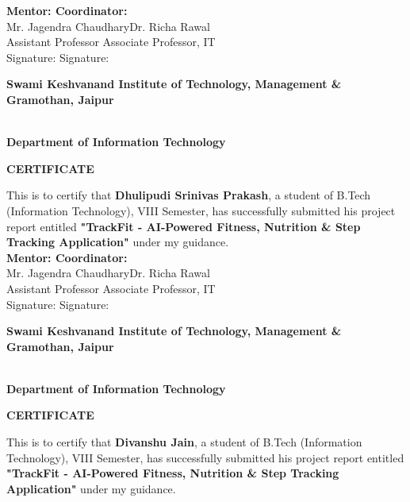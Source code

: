 \documentclass[12pt]{report}
\newcommand{\projecttitle}{TrackFit - AI-Powered Fitness, Nutrition \& Step Tracking Application}
\newcommand{\mentorname}{Mr. Jagendra Chaudhary}
\newcommand{\coordinatorname}{Dr. Richa Rawal}
\begin{document}
\textbf{Mentor: \hfill Coordinator: \hspace{1.5cm}} \\
\mentorname \hfill \coordinatorname \hspace{1.8cm} \\
Assistant Professor \hfill Associate Professor, IT \hspace{1.0cm} \\
Signature: \hfill Signature: \hspace{3.0cm}

\newpage
\begin{center}
    \begin{Large}
        \textbf{Swami Keshvanand Institute of Technology, Management \& Gramothan, Jaipur}
    \end{Large}\\
    \textbf{Department of Information Technology} \\[0.7cm]
    \begin{Large}
        \textbf{CERTIFICATE}
    \end{Large}
\end{center}
This is to certify that \textbf{Dhulipudi Srinivas Prakash}, a student of B.Tech (Information Technology), VIII Semester, has successfully submitted his project report entitled \textbf{"\projecttitle"} under my guidance. \\

\textbf{Mentor: \hfill Coordinator: \hspace{1.5cm}} \\
\mentorname \hfill \coordinatorname \hspace{1.8cm} \\
Assistant Professor \hfill Associate Professor, IT \hspace{1.0cm} \\
Signature: \hfill Signature: \hspace{3.0cm}

\newpage
\begin{center}
    \begin{Large}
        \textbf{Swami Keshvanand Institute of Technology, Management \& Gramothan, Jaipur}
    \end{Large}\\
    \textbf{Department of Information Technology} \\[0.7cm]
    \begin{Large}
        \textbf{CERTIFICATE}
    \end{Large}
\end{center}
This is to certify that \textbf{Divanshu Jain}, a student of B.Tech (Information Technology), VIII Semester, has successfully submitted his project report entitled \textbf{"\projecttitle"} under my guidance. \\
\end{document}
